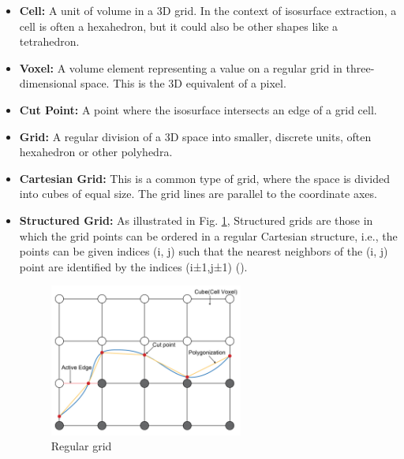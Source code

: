 \begin{itemize}
    \item \textbf{Cell:} A unit of volume in a 3D grid. In the context of isosurface extraction, a cell is often a hexahedron, but it could also be other shapes like a tetrahedron.
    \vspace{1.5mm}
    \item \textbf{Voxel:} A volume element representing a value on a regular grid in three-dimensional space. This is the 3D equivalent of a pixel.
    \vspace{1.5mm}
    \item \textbf{Cut Point:} A point where the isosurface intersects an edge of a grid cell.
    \vspace{1.5mm}
    \item \textbf{Grid:} A regular division of a 3D space into smaller, discrete units, often hexahedron or other polyhedra.
    \vspace{1.5mm}
    \item \textbf{Cartesian Grid:} This is a common type of grid, where the space is divided into cubes of equal size. The grid lines are parallel to the coordinate axes.
    \vspace{1.5mm}
    \item \textbf{Structured Grid:} As illustrated in Fig. \ref{fig:Regular-grid}, Structured grids are those in which the grid points can be ordered in a regular Cartesian structure, i.e., the points can be given indices (i, j) such that the nearest neighbors of the (i, j) point are identified by the indices (i±1,j±1) (\cite{David_2003}).
    \vspace{1.5mm}

    \begin{figure}
    \centering
    \includegraphics[height=0.5\textwidth,width=0.6\textwidth]{Figures/Regular_grid.jpg}
    \decoRule
    \caption{Regular grid}
    \label{fig:Regular-grid}
    \end{figure}
    

\end{itemize}
